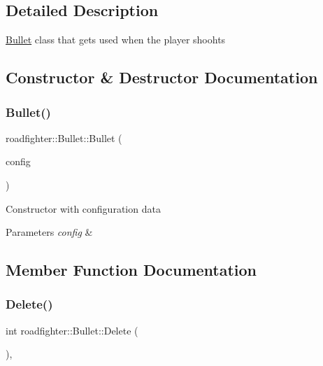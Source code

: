 \subsection{Detailed Description}
\hyperlink{classroadfighter_1_1Bullet}{Bullet} class that gets used when the player shoohts 

\subsection{Constructor \& Destructor Documentation}
\mbox{\label{classroadfighter_1_1Bullet_abcbb5d8fd968f182994fdbca0aab9f6d}} 
\subsubsection{\texorpdfstring{Bullet()}{Bullet()}}
{\footnotesize\ttfamily roadfighter\+::\+Bullet\+::\+Bullet (\begin{DoxyParamCaption}\item[{std\+::shared\+\_\+ptr$<$ \hyperlink{classConfigData}{Config\+Data} $>$}]{config }\end{DoxyParamCaption})}

Constructor with configuration data 
\begin{DoxyParams}{Parameters}
{\em config} & \\
\hline
\end{DoxyParams}


\subsection{Member Function Documentation}
\mbox{\label{classroadfighter_1_1Bullet_a011f2271222e0fa9bcf25193c2b94932}} 
\subsubsection{\texorpdfstring{Delete()}{Delete()}}
{\footnotesize\ttfamily int roadfighter\+::\+Bullet\+::\+Delete (\begin{DoxyParamCaption}{ }\end{DoxyParamCaption})\hspace{0.3cm}{\ttfamily [override]}, {\ttfamily [virtual]}}


